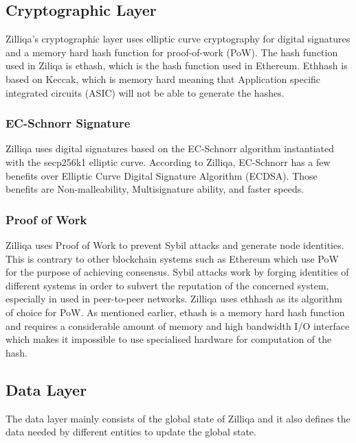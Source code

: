 \documentclass[a4paper,twoside,phd]{BYUPhys}
\begin{document}
\subsection{Cryptographic Layer}
Zilliqa's cryptographic layer uses elliptic curve cryptography for digital signatures and a memory hard hash function for proof-of-work (PoW)\cite{}. The hash function used in Ziliqa is ethash, which is the hash function used in Ethereum. Ethhash is based on Keccak, which is memory hard meaning that Application specific integrated circuits (ASIC) will not be able to generate the hashes. 
\subsubsection{EC-Schnorr Signature}
Zilliqa uses digital signatures based on the EC-Schnorr algorithm instantiated with the secp256k1 elliptic curve\cite{}. According to Zilliqa, EC-Schnorr has a few benefits over Elliptic Curve Digital Signature Algorithm (ECDSA). Those benefits are Non-malleability, Multisignature ability, and faster speeds\cite{}. 

\subsubsection{Proof of Work}
Zilliqa uses Proof of Work to prevent Sybil attacks and generate node identities\cite{}. This is contrary to other blockchain systems such as Ethereum which use PoW for the purpose of achieving consensus. Sybil attacks work by forging identities of different systems in order to subvert the reputation of the concerned system, especially in used in peer-to-peer networks\cite{}. Zilliqa uses ethhash as its algorithm of choice for PoW. As mentioned earlier, ethash is a memory hard hash function and requires a considerable amount of memory and high bandwidth I/O interface which makes it impossible to use specialised hardware for computation of the hash.
\subsection{Data Layer}
The data layer mainly consists of the global state of Zilliqa and it also defines the data needed by different entities to update the global state. 
\end{document}
